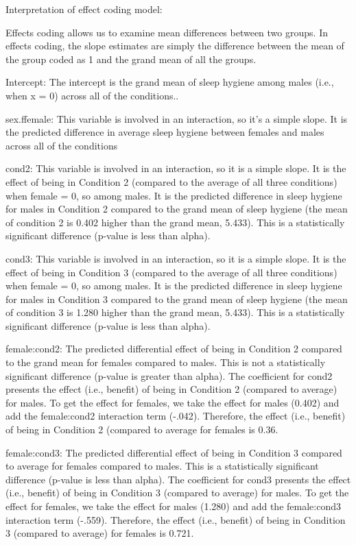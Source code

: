 \documentclass[]{article}
\begin{document}
Interpretation of effect coding model:

Effects coding allows us to examine mean differences between two groups.
In effects coding, the slope estimates are simply the difference between
the mean of the group coded as 1 and the grand mean of all the groups.

Intercept: The intercept is the grand mean of sleep hygiene among males
(i.e., when x = 0) across all of the conditions..

sex.ffemale: This variable is involved in an interaction, so it's a
simple slope. It is the predicted difference in average sleep hygiene
between females and males across all of the conditions

cond2: This variable is involved in an interaction, so it is a simple
slope. It is the effect of being in Condition 2 (compared to the average
of all three conditions) when female = 0, so among males. It is the
predicted difference in sleep hygiene for males in Condition 2 compared
to the grand mean of sleep hygiene (the mean of condition 2 is 0.402
higher than the grand mean, 5.433). This is a statistically significant
difference (p-value is less than alpha).

cond3: This variable is involved in an interaction, so it is a simple
slope. It is the effect of being in Condition 3 (compared to the average
of all three conditions) when female = 0, so among males. It is the
predicted difference in sleep hygiene for males in Condition 3 compared
to the grand mean of sleep hygiene (the mean of condition 3 is 1.280
higher than the grand mean, 5.433). This is a statistically significant
difference (p-value is less than alpha).

female:cond2: The predicted differential effect of being in Condition 2
compared to the grand mean for females compared to males. This is not a
statistically significant difference (p-value is greater than alpha).
The coefficient for cond2 presents the effect (i.e., benefit) of being
in Condition 2 (compared to average) for males. To get the effect for
females, we take the effect for males (0.402) and add the female:cond2
interaction term (-.042). Therefore, the effect (i.e., benefit) of being
in Condition 2 (compared to average for females is 0.36.

female:cond3: The predicted differential effect of being in Condition 3
compared to average for females compared to males. This is a
statistically significant difference (p-value is less than alpha). The
coefficient for cond3 presents the effect (i.e., benefit) of being in
Condition 3 (compared to average) for males. To get the effect for
females, we take the effect for males (1.280) and add the female:cond3
interaction term (-.559). Therefore, the effect (i.e., benefit) of being
in Condition 3 (compared to average) for females is 0.721.
\end{document}

